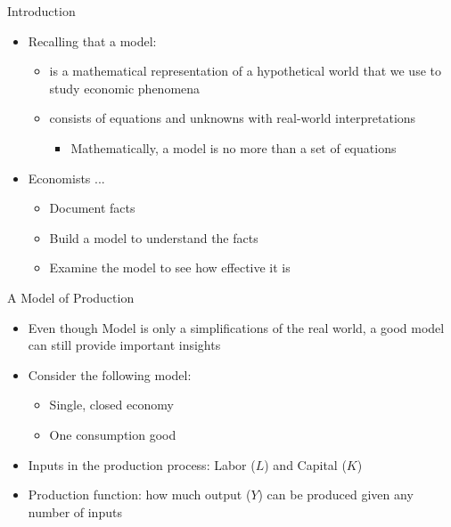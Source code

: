 \documentclass[aspectratio=1610]{beamer}
\begin{document}
\begin{frame}[wide]{Introduction}
	\begin{itemize}
		\item Recalling that a model:
		\begin{itemize}
			\item is a mathematical representation of a hypothetical world that we use to study economic phenomena
			\item consists of equations and unknowns with real-world interpretations
			\begin{itemize}
				\item Mathematically, a model is no more than a set of equations
			\end{itemize}
		\end{itemize}
		\item Economists ...
		\begin{itemize}
			\item Document facts
			\item Build a model to understand the facts
			\item Examine the model to see how effective it is
		\end{itemize}
		
	\end{itemize}
\end{frame}

\begin{frame}[wide]{A Model of Production}
	\begin{itemize}
		\item Even though Model is only a simplifications of the real world, a good model can still  provide important insights
		\item Consider the following model:
		\begin{itemize}
			\item Single, closed economy
			\item One consumption good
		\end{itemize}
		\item Inputs in the production process: Labor ($L$) and Capital ($K$)
		\item Production function: how much output ($Y$) can be produced given any number of inputs		
	\end{itemize}
\end{frame}
\end{document}
